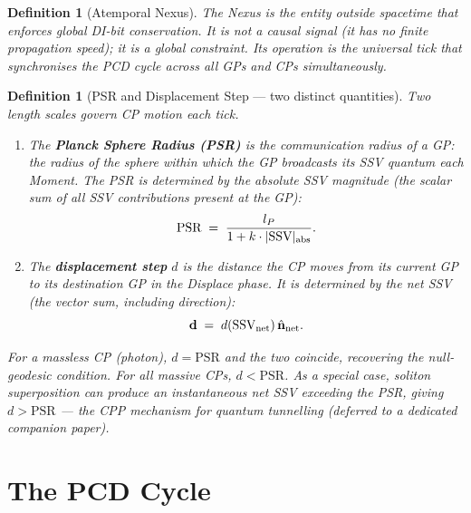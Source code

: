 \documentclass[12pt]{article}
\newtheorem{definition}[theorem]{Definition}
\begin{document}
\begin{definition}[Atemporal Nexus]
The Nexus is the entity outside spacetime that enforces global DI-bit
conservation.  It is not a causal signal (it has no finite propagation speed);
it is a \emph{global constraint}.  Its operation is the universal tick that
synchronises the PCD cycle across all GPs and CPs simultaneously.
\end{definition}

\begin{definition}[PSR and Displacement Step --- two distinct quantities]
\label{def:psr-disp}
Two length scales govern CP motion each tick.
\begin{enumerate}[label=(\roman*)]
  \item The \textbf{Planck Sphere Radius (PSR)} is the communication radius
    of a GP: the radius of the sphere within which the GP broadcasts its SSV
    quantum each Moment.  The PSR is determined by the \emph{absolute} SSV
    magnitude (the scalar sum of all SSV contributions present at the GP):
    \begin{equation}
      \text{PSR} \;=\; \frac{l_P}{1 + k\cdot|\text{SSV}|_{\rm abs}}.
      \label{eq:PSR-def}
    \end{equation}
  \item The \textbf{displacement step} $d$ is the distance the CP moves from
    its current GP to its destination GP in the Displace phase.  It is
    determined by the \emph{net} SSV (the vector sum, including direction):
    \begin{equation}
      \mathbf{d} \;=\; d(\text{SSV}_{\rm net})\,\hat{\mathbf{n}}_{\rm net}.
      \label{eq:disp}
    \end{equation}
\end{enumerate}
For a massless CP (photon), $d = \text{PSR}$ and the two coincide, recovering
the null-geodesic condition.  For all massive CPs, $d < \text{PSR}$.  As a
special case, soliton superposition can produce an instantaneous net SSV
exceeding the PSR, giving $d > \text{PSR}$ --- the CPP mechanism for quantum
tunnelling (deferred to a dedicated companion paper).
\end{definition}

\section{The PCD Cycle}
\label{sec:pcd}
\end{document}
